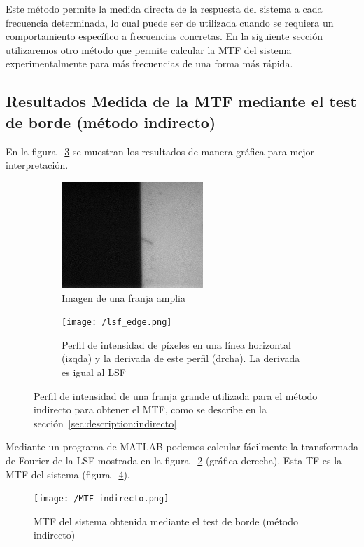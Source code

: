 \documentclass{./packages/optica-article}
\begin{document}
Este método permite la medida directa de la respuesta del sistema a cada frecuencia determinada, lo cual puede ser de utilizada cuando se requiera un comportamiento específico a frecuencias concretas. En la siguiente sección utilizaremos otro método que permite calcular la MTF del sistema experimentalmente para más frecuencias de una forma más rápida.





\subsection{Resultados Medida de la MTF mediante el test de borde (método indirecto)}\label{sec:resultados:indirecto}


En la figura ~\ref{fig:perfil} se muestran los resultados de manera gráfica para mejor interpretación.
\begin{figure}[hptb]
	\centering
	\begin{subfigure}[t]{0.35\textwidth}
		\centering
		\includegraphics[height=4cm]{edge_large_line}
		\caption{Imagen de una franja amplia}\label{fig:perfil:img}
	\end{subfigure}
	\quad
	\begin{subfigure}[t]{0.60\textwidth}
		\centering
		\texttt{[image: /lsf\_edge.png]}
		\caption{Perfil de intensidad de píxeles en una línea horizontal (izqda) y la derivada de este perfil (drcha). La derivada es igual al LSF}\label{fig:perfil:graph}
	\end{subfigure}
	\caption{Perfil de intensidad de una franja grande utilizada para el método indirecto para obtener el MTF, como se describe en la sección~\ref{sec:description:indirecto}}\label{fig:perfil}
\end{figure}

Mediante un programa de MATLAB podemos calcular fácilmente la transformada de Fourier de la LSF mostrada en la figura ~\ref{fig:perfil:graph} (gráfica derecha). Esta TF es la MTF del sistema (figura ~\ref{fig:mtf-indirecto}).

\begin{figure}
    \centering
    \texttt{[image: /MTF-indirecto.png]}
    \caption{MTF del sistema obtenida mediante el test de borde (método indirecto)}
    \label{fig:mtf-indirecto}
\end{figure}
\end{document}
